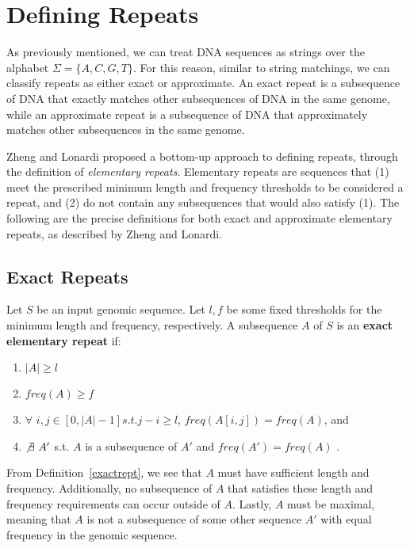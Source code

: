 \section{Defining Repeats}
As previously mentioned, we can treat DNA sequences as strings over the alphabet $\Sigma=\lbrace A, C, G, T \rbrace$. For this reason, similar to string matchings, we can classify repeats as either exact or approximate. An exact repeat is a subsequence of DNA that exactly matches other subsequences of DNA in the same genome, while an approximate repeat is a subsequence of DNA that approximately matches other subsequences in the same genome.

Zheng and Lonardi \cite{zheng2005discovery} proposed a bottom-up approach to defining repeats, through the definition of \textit{elementary repeats}. Elementary repeats are sequences that (1) meet the prescribed minimum length and frequency thresholds to be considered a repeat, and (2) do not contain any subsequences that would also satisfy (1). The following are the precise definitions for both exact and approximate elementary repeats, as described by Zheng and Lonardi.

\subsection{Exact Repeats}
\begin{defn}
Let $S$ be an input genomic sequence. Let $l, f$ be some fixed thresholds for the minimum length and frequency, respectively.  A subsequence $A$ of $S$ is an \textbf{exact elementary repeat} if:
\begin{enumerate}
\item{$|A| \geq l$}
\item{$freq(A) \geq f$}
\item{$\forall$ $i, j \in [0,|A|-1] s.t. j-i \geq l$,  $freq(A[i,j]) = freq(A)$, and}
\item{$\not\exists\ A'$ s.t. $A$ is a subsequence of $A'$ and $freq(A') = freq(A)$ \cite{zheng2005discovery}.}
\end{enumerate}
\label{exactrept}
\end{defn}

From Definition~\ref{exactrept}, we see that $A$ must have sufficient length and frequency. Additionally, no subsequence of $A$ that satisfies these length and frequency requirements can occur outside of $A$. Lastly, $A$ must be maximal, meaning that $A$ is not a subsequence of some other sequence $A'$ with equal frequency in the genomic sequence.

